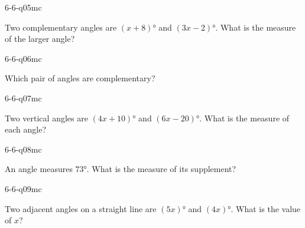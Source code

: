 \begin{practiceQuestion}{6-6-q05}{mc}
\begin{questionText}
Two complementary angles are $(x + 8)°$ and $(3x - 2)°$. What is the measure of the larger angle?
\end{questionText}
\end{practiceQuestion}

\begin{practiceQuestion}{6-6-q06}{mc}
\begin{questionText}
Which pair of angles are complementary?
\end{questionText}
\end{practiceQuestion}

\begin{practiceQuestion}{6-6-q07}{mc}
\begin{questionText}
Two vertical angles are $(4x + 10)°$ and $(6x - 20)°$. What is the measure of each angle?
\end{questionText}
\end{practiceQuestion}

\begin{practiceQuestion}{6-6-q08}{mc}
\begin{questionText}
An angle measures $73°$. What is the measure of its supplement?
\end{questionText}
\end{practiceQuestion}

\begin{practiceQuestion}{6-6-q09}{mc}
\begin{questionText}
Two adjacent angles on a straight line are $(5x)°$ and $(4x)°$. What is the value of $x$?
\end{questionText}
\end{practiceQuestion}

